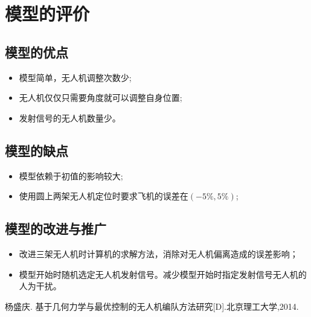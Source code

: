\documentclass[withoutpreface,bwprint]{cumcmthesis} %
\begin{document}
	
	\section{模型的评价}
\subsection{模型的优点}
\begin{itemize}
	\item 模型简单，无人机调整次数少;
	\item 无人机仅仅只需要角度就可以调整自身位置;
	\item 发射信号的无人机数量少。
\end{itemize}
\subsection{模型的缺点}

\begin{itemize}
	\item 模型依赖于初值的影响较大;
	\item 使用圆上两架无人机定位时要求飞机的误差在$(-5\%,5\%)$;
\end{itemize}

\subsection{模型的改进与推广}
\begin{itemize}
	\item 改进三架无人机时计算机的求解方法，消除对无人机偏离造成的误差影响；
	\item 模型开始时随机选定无人机发射信号。减少模型开始时指定发射信号无人机的人为干扰。
\end{itemize}
	
	
		\begin{thebibliography}{9}%
			杨盛庆. 基于几何力学与最优控制的无人机编队方法研究[D].北京理工大学,2014.
		\end{thebibliography}
	
	\nocite{*}
	
	
\end{document}
